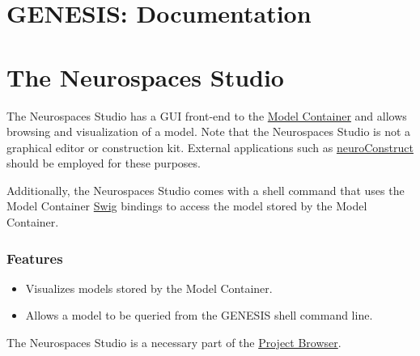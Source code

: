 \documentclass[12pt]{article}
\begin{document}
\section*{GENESIS: Documentation}

\section*{The Neurospaces Studio}

The Neurospaces Studio has a GUI front-end to the \href{../document-model-container/document-model-container.pdf}{Model Container} and allows browsing and visualization of a model. Note that the Neurospaces Studio is not a graphical editor or construction kit. External applications such as \href{http:\\www.physiol.ucl.ac.uk/research/silver_a/neuroConstruct/}{neuroConstruct} should be employed for these purposes.

Additionally, the Neurospaces Studio comes with a shell command that uses the Model Container \href{http://www.swig.org/}{Swig} bindings to access the model stored by the Model Container.

\subsubsection*{Features}

\begin{itemize}

\item Visualizes models stored by the Model Container.

\item  Allows a model to be queried from the GENESIS shell command line.

\end{itemize}

The Neurospaces Studio is a necessary part of the \href{../document-project-browser/document-project-browser}{Project Browser}.
\end{document}
